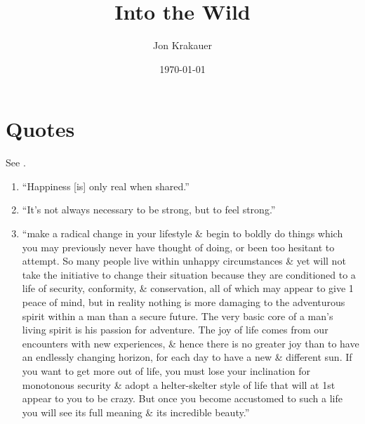 \documentclass{article}
\title{Into the Wild}
\author{Jon Krakauer}
\date{\today}
\numberwithin{equation}{section}
\begin{document}
\maketitle
\tableofcontents


\section{Quotes}
See \cite{Krakauer1997}.
\begin{enumerate}
	\item ``Happiness [is] only real when shared.''
	\item ``It's not always necessary to be strong, but to feel strong.''
	\item ``make a radical change in your lifestyle \& begin to boldly do things which you may previously never have thought of doing, or been too hesitant to attempt. So many people live within unhappy circumstances \& yet will not take the initiative to change their situation because they are conditioned to a life of security, conformity, \& conservation, all of which may appear to give 1 peace of mind, but in reality nothing is more damaging to the adventurous spirit within a man than a secure future. The very basic core of a man's living spirit is his passion for adventure. The joy of life comes from our encounters with new experiences, \& hence there is no greater joy than to have an endlessly changing horizon, for each day to have a new \& different sun. If you want to get more out of life, you must lose your inclination for monotonous security \& adopt a helter-skelter style of life that will at 1st appear to you to be crazy. But once you become accustomed to such a life you will see its full meaning \& its incredible beauty.''
\end{enumerate}


\printbibliography[heading=bibintoc]
	
\end{document}
